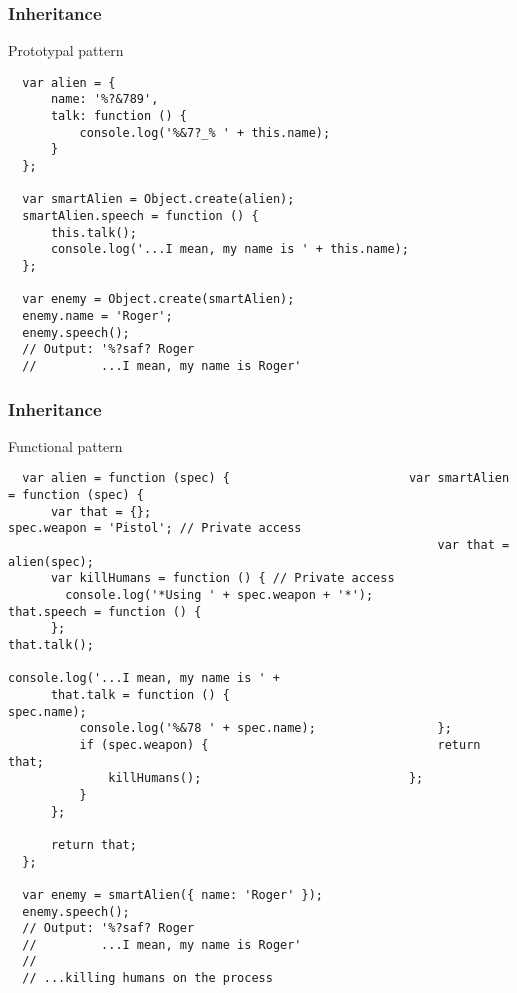 \begin{frame}[fragile]
  \frametitle{Inheritance}

  \begin{block}{Prototypal pattern}
  {\tiny
  \begin{verbatim}
  var alien = {
      name: '%?&789',
      talk: function () {
          console.log('%&7?_% ' + this.name);
      }
  };

  var smartAlien = Object.create(alien);
  smartAlien.speech = function () {
      this.talk();
      console.log('...I mean, my name is ' + this.name);
  };

  var enemy = Object.create(smartAlien);
  enemy.name = 'Roger';
  enemy.speech(); 
  // Output: '%?saf? Roger
  //         ...I mean, my name is Roger'
  \end{verbatim}
  }
  \end{block}
\end{frame}

\begin{frame}[fragile]
  \frametitle{Inheritance}

  \begin{block}{Functional pattern}
  {\tiny
  \begin{verbatim}
  var alien = function (spec) {                         var smartAlien = function (spec) {
      var that = {};                                        spec.weapon = 'Pistol'; // Private access
                                                            var that = alien(spec);
      var killHumans = function () { // Private access                                                             
        console.log('*Using ' + spec.weapon + '*');         that.speech = function () {
      };                                                        that.talk();
                                                                console.log('...I mean, my name is ' +
      that.talk = function () {                                   spec.name);
          console.log('%&78 ' + spec.name);                 };                                                       
          if (spec.weapon) {                                return that;
              killHumans();                             };
          }
      };

      return that;
  };

  var enemy = smartAlien({ name: 'Roger' });
  enemy.speech(); 
  // Output: '%?saf? Roger
  //         ...I mean, my name is Roger'
  //
  // ...killing humans on the process
  \end{verbatim}
  }
  \end{block}
\end{frame}
